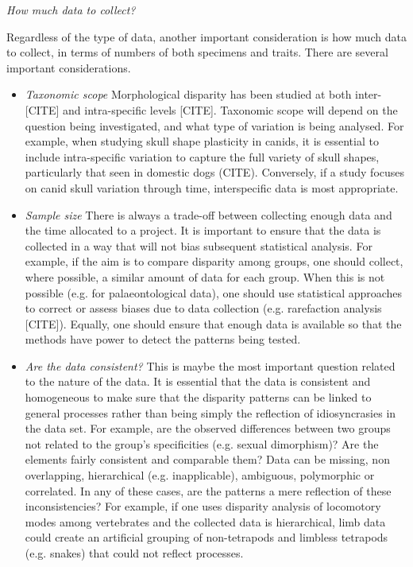 \documentclass[12pt,letterpaper]{article}
\renewcommand{\subsection}[1]{%
\bigskip
\begin{center}
\begin{large}
\normalfont\itshape #1
\end{large}
\end{center}}
\begin{document}
\subsection{How much data to collect?}
Regardless of the type of data, another important consideration is how much data to collect, in terms of numbers of both specimens and traits.
There are several important considerations.
\begin{itemize}
    \item \textit{Taxonomic scope}
    Morphological disparity has been studied at both inter-[CITE] and intra-specific levels [CITE].
    Taxonomic scope will depend on the question being investigated, and what type of variation is being analysed.
    For example, when studying skull shape plasticity in canids, it is essential to include intra-specific variation to capture the full variety of skull shapes, particularly that seen in domestic dogs (CITE).
    Conversely, if a study focuses on canid skull variation through time, interspecific data is most appropriate.
    \item \textit{Sample size}
    There is always a trade-off between collecting enough data and the time allocated to a project.
    It is important to ensure that the data is collected in a way that will not bias subsequent statistical analysis.
    For example, if the aim is to compare disparity among groups, one should collect, where possible, a similar amount of data for each group.
    When this is not possible (e.g. for palaeontological data), one should use statistical approaches to correct or assess biases due to data collection (e.g. rarefaction analysis [CITE]).
    Equally, one should ensure that enough data is available so that the methods have power to detect the patterns being tested.
    \item \textit{Are the data consistent?} %
    This is maybe the most important question related to the nature of the data.
    It is essential that the data is consistent and homogeneous to make sure that the disparity patterns can be linked to general processes rather than being simply the reflection of idiosyncrasies in the data set.
    For example, are the observed differences between two groups not related to the group's specificities (e.g. sexual dimorphism)?
    Are the elements fairly consistent and comparable them?
    Data can be missing, non overlapping, hierarchical (e.g. inapplicable), ambiguous, polymorphic or correlated.
    In any of these cases, are the patterns a mere reflection of these inconsistencies?
    For example, if one uses disparity analysis of locomotory modes among vertebrates and the collected data is hierarchical, limb data could create an artificial grouping of non-tetrapods and limbless tetrapods (e.g. snakes) that could not reflect processes.
\end{itemize}
\end{document}
